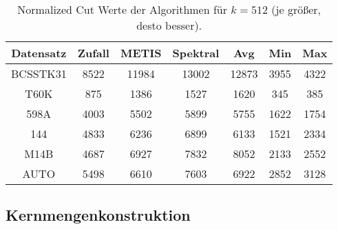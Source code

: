 \begin{table}[h!]
\centering
\begin{tabular}{@{}ccccccc@{}} \toprule
	\textbf{Datensatz} & \textbf{Zufall} & \textbf{METIS} & \textbf{Spektral} & \textbf{Avg} & \textbf{Min} & \textbf{Max} \\ \midrule
	BCSSTK31 	& 8522 & 11984 & 13002 & 12873 & 3955 & 4322 \\
	T60K 		& 875 & 1386 & 1527 & 1620 & 345 & 385 \\
	598A 		& 4003 & 5502 & 5899 & 5755 & 1622 & 1754 \\
	144 		& 4833 & 6236 & 6899 & 6133 & 1521 & 2334 \\
	M14B 		& 4687 & 6927 & 7832 & 8052 & 2133 & 2552 \\
	AUTO 		& 5498 & 6610 & 7603 & 6922 & 2852 & 3128 \\
	\bottomrule
\end{tabular}
\caption{Normalized Cut Werte der Algorithmen für $k = 512$ (je größer, desto besser).}
\label{tbl:experiment-experiment-kkmpp-ncut-512}
\end{table}
\newpage

\subsection{Kernmengenkonstruktion}
\label{subsection:experiment-coreset}